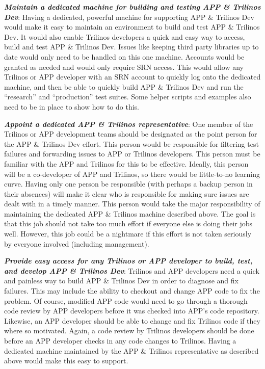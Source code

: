\documentclass[pdf,ps2pdf,11pt]{SANDreport}
\begin{document}
{}\textit{\textbf{Maintain a dedicated machine for building and testing APP \&
Trilinos Dev}}: Having a dedicated, powerful machine for supporting APP \&
Trilinos Dev would make it easy to maintain an environment to build and test
APP \& Trilinos Dev.  It would also enable Trilinos developers a quick and easy
way to access, build and test APP \& Trilinos Dev.  Issues like keeping third
party libraries up to date would only need to be handled on this one machine.
Accounts would be granted as needed and would only require SRN access.  This
would allow any Trilinos or APP developer with an SRN account to quickly log
onto the dedicated machine, and then be able to quickly build APP \& Trilinos
Dev and run the ``research'' and ``production'' test suites.  Some helper
scripts and examples also need to be in place to show how to do this.

{}\textit{\textbf{Appoint a dedicated APP \& Trilinos representative}}: One member
of the Trilinos or APP development teams should be designated as the point
person for the APP \& Trilinos Dev effort.  This person would be responsible
for filtering test failures and forwarding issues to APP or Trilinos
developers.  This person must be familiar with the APP and Trilinos for this
to be effective.  Ideally, this person will be a co-developer of APP and
Trilinos, so there would be little-to-no learning curve.  Having only one
person be responsible (with perhaps a backup person in their absences) will
make it clear who is responsible for making sure issues are dealt with in a
timely manner.  This person would take the major responsibility of maintaining
the dedicated APP \& Trilinos machine described above. The goal is that this
job should not take too much effort if everyone else is doing their jobs well.
However, this job could be a nightmare if this effort is not taken seriously
by everyone involved (including management).

{}\textit{\textbf{Provide easy access for any Trilinos or APP developer to build,
test, and develop APP \& Trilinos Dev}}: Trilinos and APP developers need a
quick and painless way to build APP \& Trilinos Dev in order to diagnose and
fix failures.  This may include the ability to checkout and change APP code to
fix the problem.  Of course, modified APP code would need to go through a
thorough code review by APP developers before it was checked into APP's code
repository.  Likewise, an APP developer should be able to change and fix
Trilinos code if they where so motivated.  Again, a code review by Trilinos
developers should be done before an APP developer checks in any code changes
to Trilinos.  Having a dedicated machine maintained by the APP \& Trilinos
representative as described above would make this easy to support.
\end{document}

